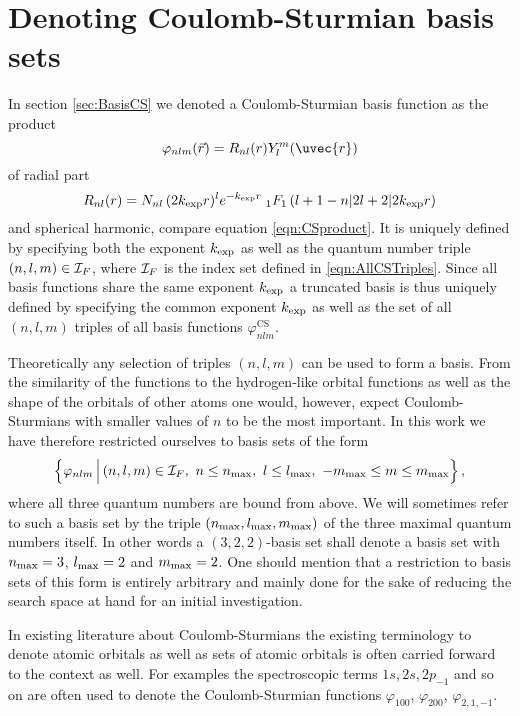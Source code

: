 \pagebreak
\section{Denoting Coulomb-Sturmian basis sets}
\label{sec:DenotingCSbasis}
In section \vref{sec:BasisCS}
we denoted a Coulomb-Sturmian basis function as the product
\begin{equation}
	\varphi_{nlm}(\vec{r}) = R_{nl}(r) Y_l^m(\uvec{r})
\end{equation}
of radial part
\begin{equation}
	\label{eqn:RadialPartCsRepeated}
	R_{nl}(r) = N_{nl} \, (2k_\text{exp} r)^l e^{-k_\text{exp} r}
	\;_1F_1\left(l+1-n \middle| 2l+2 \middle|2k_\text{exp} r\right)
\end{equation}
and spherical harmonic, compare equation \eqref{eqn:CSproduct}.
It is uniquely defined by specifying both the \CS exponent $k_\text{exp}$
as well as the quantum number triple $(n,l,m) \in \mathcal{I}_F$,
where $\mathcal{I}_F$ is the index set defined in \eqref{eqn:AllCSTriples}.
Since all basis functions share the same exponent $k_\text{exp}$
a truncated \CS basis is thus uniquely defined by specifying
the common exponent $k_\text{exp}$ as well as the set of all $(n, l, m)$
triples of all basis functions $\varphi^\text{CS}_{nlm}$.

Theoretically any selection of triples $(n, l, m)$ can be used to form a \CS basis.
From the similarity of the \CS functions to the hydrogen-like orbital functions
as well as the shape of the orbitals of other atoms
one would, however, expect Coulomb-Sturmians with smaller values of $n$
to be the most important.
In this work we have therefore restricted ourselves to \CS basis sets
of the form
\[ \left\{ \varphi_{nlm} \, \Big| \,  (n, l, m) \in \mathcal{I}_F, \   n \le n_\text{max},
	\  l \le l_\text{max},
	\  -m_\text{max} \le m \le m_\text{max} \right\},
\]
\ie where all three quantum numbers are bound from above.
We will sometimes refer to such a \CS basis set by the triple
$(n_\text{max}, l_\text{max}, m_\text{max})$ of the three maximal quantum numbers itself.
In other words a $(3,2,2)$-basis set shall denote a basis set with
$n_\text{max} = 3$, $l_\text{max} = 2$ and $m_\text{max} = 2$.
One should mention that a restriction to basis sets of this form
is entirely arbitrary
and mainly done for the sake of reducing the search space at hand
for an initial investigation.

In existing literature about Coulomb-Sturmians the existing terminology
to denote atomic orbitals as well as sets of atomic orbitals is often carried
forward to the \CS context as well.
For examples the spectroscopic terms $1s, 2s, 2p_{-1}$ and so on
are often used to denote the Coulomb-Sturmian functions
$\varphi_{100}$, $\varphi_{200}$, $\varphi_{2,1,-1}$.
